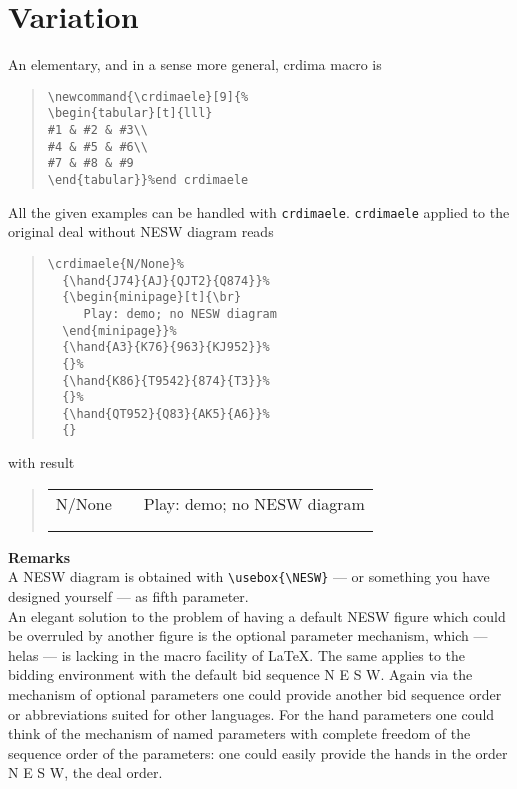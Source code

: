 \section{Variation}
An elementary, and in a sense more general, crdima macro is
\begin{quote}
\begin{verbatim}
\newcommand{\crdimaele}[9]{%
\begin{tabular}[t]{lll}
#1 & #2 & #3\\
#4 & #5 & #6\\
#7 & #8 & #9
\end{tabular}}%end crdimaele
\end{verbatim}
\end{quote}
All the given examples can be handled with \verb=crdimaele=.
\verb=crdimaele= applied to
the original deal without NESW diagram reads
\begin{quote}
\begin{verbatim}
\crdimaele{N/None}%
  {\hand{J74}{AJ}{QJT2}{Q874}}%
  {\begin{minipage}[t]{\br}
     Play: demo; no NESW diagram
  \end{minipage}}%
  {\hand{A3}{K76}{963}{KJ952}}%
  {}%
  {\hand{K86}{T9542}{874}{T3}}%
  {}%
  {\hand{QT952}{Q83}{AK5}{A6}}%
  {}
\end{verbatim}
\end{quote}
with result
\begin{quote}
\newcommand{\crdimaele}[9]{%
\begin{tabular}[t]{lll}
#1 & #2 & #3\\
#4 & #5 & #6\\
#7 & #8 & #9
\end{tabular}}%
\crdimaele{N/None}%
  {\hand{J74}{AJ}{QJT2}{Q874}}%
  {\begin{minipage}[t]{\br}
     Play: demo; no NESW diagram
  \end{minipage}}%
  {\hand{A3}{K76}{963}{KJ952}}%
  {}%
  {\hand{K86}{T9542}{874}{T3}}%
  {}%
  {\hand{QT952}{Q83}{AK5}{A6}}%
  {}
\end{quote}
{\bf Remarks} \\
A NESW diagram is obtained with
\verb=\usebox{\NESW}= --- or something
you have designed yourself ---
as fifth parameter.\\
An elegant solution to the problem of having a default
NESW figure which could be overruled by another figure
is the optional parameter mechanism, which --- helas ---
is lacking in the macro facility of \LaTeX. The same applies
to the bidding environment with the default bid sequence
N E S W. Again via the mechanism of optional parameters
one could provide another bid sequence order or
abbreviations suited for other languages.
For the hand parameters one could think of the mechanism of named
parameters with complete freedom of the sequence order
of the parameters: one could easily provide the hands
in the order N E S W, the deal order.
%
